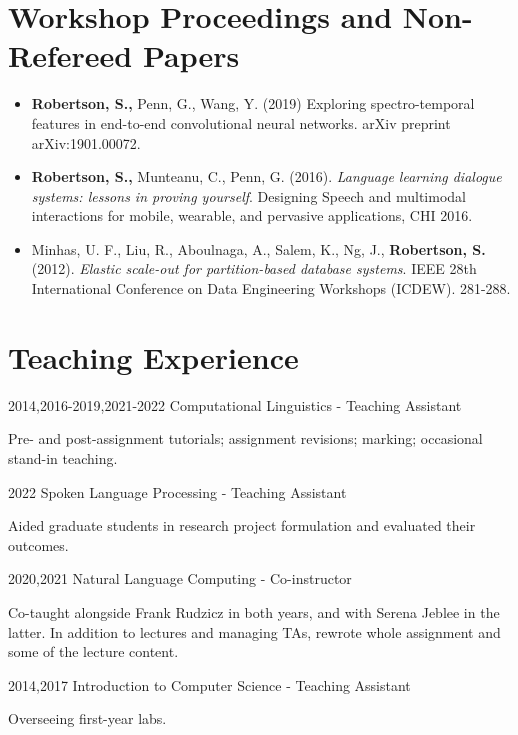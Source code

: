 \documentclass{article}
\begin{document}
\section{Workshop Proceedings and Non-Refereed Papers}
\begin{itemize}
  \item \textbf{Robertson, S.,} Penn, G., Wang, Y. (2019) Exploring
    spectro-temporal features in end-to-end convolutional neural networks.
    arXiv preprint arXiv:1901.00072.

  \item \textbf{Robertson, S.,} Munteanu, C., Penn, G. (2016).
    \textit{Language learning dialogue systems: lessons in proving yourself}.
    Designing Speech and multimodal interactions for mobile, wearable, and
    pervasive applications, CHI 2016.

  \item Minhas, U. F., Liu, R., Aboulnaga, A., Salem, K., Ng, J.,
    \textbf{Robertson, S.} (2012). \textit{Elastic scale-out for
    partition-based database systems}. IEEE 28th International Conference on
    Data Engineering Workshops (ICDEW). 281-288.

\end{itemize}


\section{Teaching Experience}
\begin{CV}
  
  \item[2014,2016-2019,2021-2022] Computational Linguistics - Teaching Assistant

    Pre- and post-assignment tutorials; assignment revisions; marking;
    occasional stand-in teaching.

  \item[2022] Spoken Language Processing - Teaching Assistant

    Aided graduate students in research project formulation and evaluated their
    outcomes.

  \item[2020,2021] Natural Language Computing - Co-instructor

    Co-taught alongside Frank Rudzicz in both years, and with Serena Jeblee in
    the latter. In addition to lectures and managing TAs, rewrote whole
    assignment and some of the lecture content.

  \item[2014,2017] Introduction to Computer Science - Teaching Assistant

    Overseeing first-year labs.

\end{CV}
\end{document}
